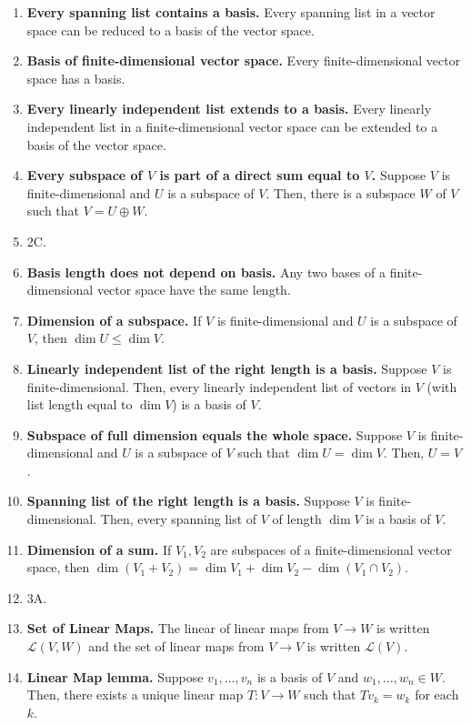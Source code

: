 \begin{enumerate}
	\item \textbf{Every spanning list contains a basis. } Every spanning list in a vector space can be reduced to a basis of the vector space. 
	\item \textbf{Basis of finite-dimensional vector space. } Every finite-dimensional vector space has a basis. 
	\item \textbf{Every linearly independent list extends to a basis. } Every linearly independent list in a finite-dimensional vector space can be extended to a basis of the vector space. 
	\item \textbf{Every subspace of $V$ is part of a direct sum equal to $V$. } Suppose $V$ is finite-dimensional and $U$ is a subspace of $V$. Then, there is a subspace $W$ of $V$ such that $V = U \oplus W$. 
	\item 2C. 
	\item \textbf{Basis length does not depend on basis. } Any two bases of a finite-dimensional vector space have the same length. 
	\item \textbf{Dimension of a subspace. } If $V$ is finite-dimensional and $U$ is a subspace of $V$, then $\dim U \leq \dim V$. 
	\item \textbf{Linearly independent list of the right length is a basis. } Suppose $V$ is finite-dimensional. Then, every linearly independent list of vectors in $V$ (with list length equal to $\dim V$) is a basis of $V$. 
	\item \textbf{Subspace of full dimension equals the whole space. } Suppose $V$ is finite-dimensional and $U$ is a subspace of $V$ such that $\dim U = \dim V$. Then, $U = V$. 
	\item \textbf{Spanning list of the right length is a basis. } Suppose $V$ is finite-dimensional. Then, every spanning list of $V$ of length $\dim V$ is a basis of $V$. 
	\item \textbf{Dimension of a sum. } If $V_1,V_2$ are subspaces of a finite-dimensional vector space, then $\dim (V_1+V_2) = \dim V_1 + \dim V_2 - \dim (V_1 \cap V_2)$. 
	\item 3A. 
	\item \textbf{Set of Linear Maps. } The linear of linear maps from $V \to W$ is written $\mathscr{L}(V,W)$ and the set of linear maps from $V \to V$ is written $\mathscr{L}(V)$. 
	\item \textbf{Linear Map lemma. } Suppose $v_1,\dots,v_n$ is a basis of $V$ and $w_1,\dots,w_n \in W$. Then, there exists a unique linear map $T: V \to W$ such that $Tv_k = w_k$ for each $k$. 

\end{enumerate}
